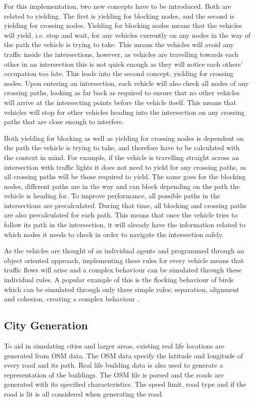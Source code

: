         For this implementation, two new concepts have to be introduced. Both are related to yielding. The first is yielding for blocking nodes, and the second is yielding for crossing nodes. Yielding for blocking nodes means that the vehicles will yield, i.e. stop and wait, for any vehicles currently on any nodes in the way of the path the vehicle is trying to take. This means the vehicles will avoid any traffic inside the intersections, however, as vehicles are travelling towards each other in an intersection this is not quick enough as they will notice each others' occupation too late. This leads into the second concept, yielding for crossing nodes. Upon entering an intersection, each vehicle will also check all nodes of any crossing paths, looking as far back as required to ensure that no other vehicles will arrive at the intersecting points before the vehicle itself. This means that vehicles will stop for other vehicles heading into the intersection on any crossing paths that are close enough to interfere.
    
        Both yielding for blocking as well as yielding for crossing nodes is dependent on the path the vehicle is trying to take, and therefore have to be calculated with the context in mind. For example, if the vehicle is travelling straight across an intersection with traffic lights it does not need to yield for any crossing paths, as all crossing paths will be those required to yield. The same goes for the blocking nodes, different paths are in the way and can block depending on the path the vehicle is heading for. To improve performance, all possible paths in the intersections are precalculated. During that time, all blocking and crossing paths are also precalculated for each path. This means that once the vehicle tries to follow its path in the intersection, it will already have the information related to which nodes it needs to check in order to navigate the intersection safely.
    
        As the vehicles are thought of as individual agents and programmed through an object oriented approach, implementing these rules for every vehicle means that traffic flows will arise and a complex behaviour can be simulated through these individual rules. A popular example of this is the flocking behaviour of birds which can be simulated through only three simple rules; separation, alignment and cohesion, creating a complex behaviour \cite{flocking-behaviour}.

    \subsection{City Generation}
        To aid in simulating cities and larger areas, existing real life locations are generated from OSM data. The OSM data specify the latitude and longitude of every road and its path. Real life building data is also used to generate a representation of the buildings. The OSM file is parsed and the roads are generated with its specified characteristics. The speed limit, road type and if the road is lit is all considered when generating the road.  

